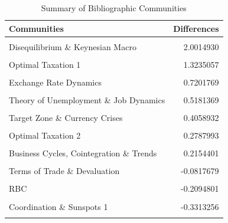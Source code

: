 \documentclass[]{elsarticle} %
\begin{document}
\begin{table}[!h]

\caption{\label{tab:summary-communities}Summary of Bibliographic Communities}
\centering
\fontsize{9}{11}\selectfont
\begin{tabular}[t]{lr}
\toprule
Communities & Differences\\
\midrule
\cellcolor{gray!6}{Modeling Consumption \& Production} & \cellcolor{gray!6}{2.0986873}\\
Disequilibrium \& Keynesian Macro & 2.0014930\\
\cellcolor{gray!6}{International Macroeconomics \& Target Zone} & \cellcolor{gray!6}{1.3359739}\\
Optimal Taxation 1 & 1.3235057\\
\cellcolor{gray!6}{Political Economics of Central Banks} & \cellcolor{gray!6}{1.0265264}\\
\addlinespace
Exchange Rate Dynamics & 0.7201769\\
\cellcolor{gray!6}{Taxation, Tobin's Q \& Monetarism} & \cellcolor{gray!6}{0.6388438}\\
Theory of Unemployment \& Job Dynamics & 0.5181369\\
\cellcolor{gray!6}{Capital \& Income Taxation} & \cellcolor{gray!6}{0.4078902}\\
Target Zone \& Currency Crises & 0.4058932\\
\addlinespace
\cellcolor{gray!6}{Coordination \& Sunspots 2} & \cellcolor{gray!6}{0.3465849}\\
Optimal Taxation 2 & 0.2787993\\
\cellcolor{gray!6}{Monetary Policy, Financial Transmission \& Cycles 2} & \cellcolor{gray!6}{0.2314883}\\
Business Cycles, Cointegration \& Trends & 0.2154401\\
\cellcolor{gray!6}{Taxation, Debt \& Growth} & \cellcolor{gray!6}{-0.0067936}\\
\addlinespace
Terms of Trade \& Devaluation & -0.0817679\\
\cellcolor{gray!6}{Endogenous Growth} & \cellcolor{gray!6}{-0.1105033}\\
RBC & -0.2094801\\
\cellcolor{gray!6}{Monetary Policy, Financial Transmission \& Cycles 1} & \cellcolor{gray!6}{-0.2379855}\\
Coordination \& Sunspots 1 & -0.3313256\\
\addlinespace
\cellcolor{gray!6}{Exchange Rate Dynamics \& Expectations} & \cellcolor{gray!6}{-0.4273431}\\

\end{tabular}
\end{table}
\end{document}
